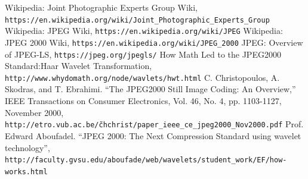 \documentclass[UTF8, letterpaper, 14pt]{article}
\begin{document}
\begin{thebibliography}{9}
Wikipedia: Joint Photographic Experts Group Wiki,\\
\texttt{https://en.wikipedia.org/wiki/Joint\_Photographic\_Experts\_Group}
Wikipedia: JPEG Wiki,
\texttt{https://en.wikipedia.org/wiki/JPEG}
Wikipedia: JPEG 2000 Wiki,
\texttt{https://en.wikipedia.org/wiki/JPEG\_2000}
JPEG: Overview of JPEG-LS,
\texttt{https://jpeg.org/jpegls/}
How Math Led to the JPEG2000 Standard:Haar Wavelet Transformation,\\
\texttt{http://www.whydomath.org/node/wavlets/hwt.html}
C. Christopoulos, A. Skodras, and T. Ebrahimi.  “The JPEG2000 Still Image Coding: An Overview,” IEEE Transactions on Consumer Electronics, Vol. 46, No. 4, pp. 1103-1127, November 2000,\\
\texttt{http://etro.vub.ac.be/\~chchrist/paper\_ieee\_ce\_jpeg2000\_Nov2000.pdf}
Prof. Edward Aboufadel.  “JPEG 2000: The Next Compression Standard using wavelet technology”,\\
\texttt{http://faculty.gvsu.edu/aboufade/web/wavelets/student\_work/EF/how-works.html}
\end{thebibliography}
\end{document}
